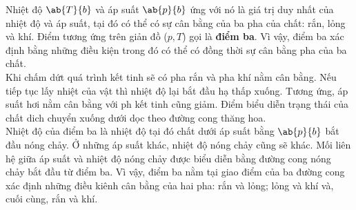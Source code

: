 Nhiệt độ $\ab{T}{b}$ và áp suất $\ab{p}{b}$ ứng với nó là giá trị duy nhất của nhiệt độ và áp suất, tại đó có thể có sự cân bằng của ba pha của chất: rắn, lỏng và khí. Điểm tương ứng trên giản đồ ($p,T$) gọi là \textbf{điểm ba}. Vì vậy, điểm ba xác định bằng những điều kiện trong đó có thể có đồng thời sự cân bằng pha của ba chất.\\

Khi chấm dứt quá trình kết tinh sẽ có pha rắn và pha khí nằm cân bằng. Nếu tiếp tục lấy nhiệt của vật thì nhiệt độ lại bắt đầu hạ thấp xuống. Tương ứng, áp suất hơi nằm cân bằng với ph kết tinh cũng giảm. Điểm biểu diễn trạng thái của chất dich chuyển xuống dưới dọc theo đường cong thăng hoa.\\

Nhiệt độ của điểm ba là nhiệt độ tại đó chất dưới áp suất bằng $\ab{p}{b}$ bắt đầu nóng chảy. Ở những áp suất khác, nhiệt độ nóng chảy cũng sẽ khác. Mối liên hệ giữa áp suất và nhiệt độ nóng chảy được biểu diễn bằng đường cong nóng chảy bắt đầu từ điểm ba. Vì vậy, điểm ba nằm tại giao điểm của ba đường cong xác định những điều kiênh cân bằng của hai pha: rắn và lỏng; lỏng và khí và, cuối cùng, rắn và khí.\\

